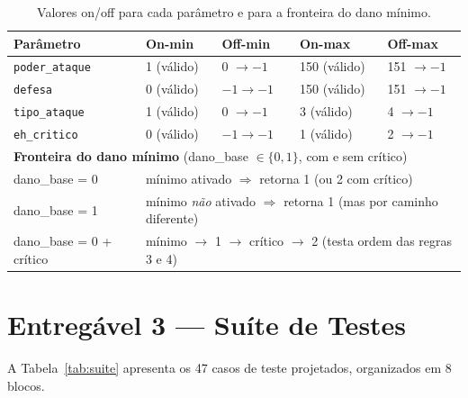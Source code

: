 \documentclass[conference, onecolumn]{IEEEtran}
\begin{document}
\begin{table}[H]
\centering
\caption{Valores on/off para cada parâmetro e para a fronteira do dano mínimo.}
\begin{tabular}{@{}lllll@{}}
\toprule
\textbf{Parâmetro} & \textbf{On-min} & \textbf{Off-min} & \textbf{On-max} & \textbf{Off-max} \\
\midrule
\texttt{poder\_ataque} & 1 (válido) & 0 $\to -1$ & 150 (válido) & 151 $\to -1$ \\
\texttt{defesa}        & 0 (válido) & $-1 \to -1$ & 150 (válido) & 151 $\to -1$ \\
\texttt{tipo\_ataque}  & 1 (válido) & 0 $\to -1$ & 3 (válido) & 4 $\to -1$ \\
\texttt{eh\_critico}   & 0 (válido) & $-1 \to -1$ & 1 (válido) & 2 $\to -1$ \\
\midrule
\multicolumn{5}{l}{\textbf{Fronteira do dano mínimo} (dano\_base $\in \{0, 1\}$, com e sem crítico)} \\
\midrule
dano\_base = 0 & \multicolumn{4}{l}{mínimo ativado $\Rightarrow$ retorna 1 (ou 2 com crítico)} \\
dano\_base = 1 & \multicolumn{4}{l}{mínimo \textit{não} ativado $\Rightarrow$ retorna 1 (mas por caminho diferente)} \\
dano\_base = 0 + crítico & \multicolumn{4}{l}{mínimo $\to$ 1 $\to$ crítico $\to$ 2 (testa ordem das regras 3 e 4)} \\
\bottomrule
\end{tabular}
\end{table}

\section{Entregável 3 — Suíte de Testes}

A Tabela~\ref{tab:suite} apresenta os 47 casos de teste projetados, organizados em 8 blocos.
\end{document}
